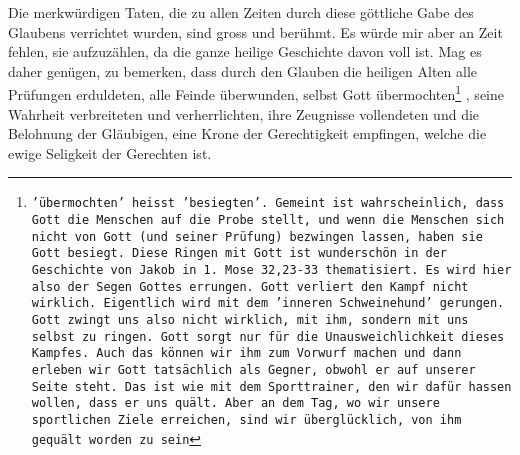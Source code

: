 Die merkwürdigen Taten, die zu allen Zeiten durch diese göttliche Gabe des
Glaubens verrichtet wurden, sind gross und berühmt. Es würde mir aber an Zeit
fehlen, sie aufzuzählen, da die ganze heilige Geschichte davon voll ist. Mag es
daher genügen, zu bemerken, dass durch den Glauben die heiligen Alten alle
Prüfungen erduldeten, alle Feinde überwunden, selbst Gott
übermochten\footnote{\texttt{'übermochten' heisst 'besiegten'. Gemeint ist
wahrscheinlich, dass Gott die Menschen auf die Probe stellt, und wenn die Menschen
sich nicht von Gott (und seiner Prüfung) bezwingen lassen, haben sie Gott
besiegt. Diese Ringen mit Gott ist wunderschön in der Geschichte von Jakob in
1. Mose 32,23-33 thematisiert. Es wird hier also der Segen Gottes
errungen. Gott verliert den Kampf nicht wirklich. Eigentlich wird
mit dem 'inneren Schweinehund' gerungen. Gott zwingt uns also nicht
wirklich, mit ihm, sondern mit uns selbst zu ringen. Gott sorgt
nur für die Unausweichlichkeit dieses Kampfes. Auch das können
wir ihm zum Vorwurf machen und dann erleben wir Gott tatsächlich
als Gegner, obwohl er auf unserer Seite steht. Das ist wie mit
dem Sporttrainer, den wir dafür hassen wollen, dass er uns quält.
Aber an dem Tag, wo wir unsere sportlichen Ziele erreichen, sind
wir überglücklich, von ihm gequält worden zu sein}}
, seine
Wahrheit verbreiteten und verherrlichten, ihre
Zeugnisse vollendeten und die
Belohnung der Gläubigen, eine Krone der
Gerechtigkeit empfingen, welche die
ewige Seligkeit der Gerechten ist.






